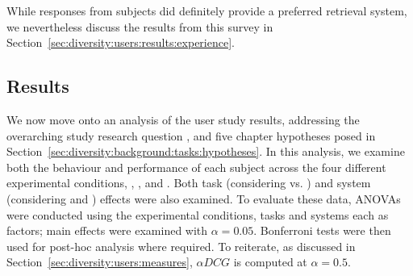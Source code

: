 While responses from subjects did definitely provide a preferred retrieval system, we nevertheless discuss the results from this survey in Section~\ref{sec:diversity:users:results:experience}.

\subsection{Results}
We now move onto an analysis of the user study results, addressing the overarching study research question , and five chapter hypotheses posed in Section~\ref{sec:diversity:background:tasks:hypotheses}. In this analysis, we examine both the behaviour and performance of each subject across the four different experimental conditions, , ,  and . Both task (considering  vs. ) and system (considering  and ) effects were also examined. To evaluate these data, ANOVAs were conducted using the experimental conditions, tasks and systems each as factors; main effects were examined with $\alpha=0.05$. Bonferroni tests were then used for post-hoc analysis where required. To reiterate, as discussed in Section~\ref{sec:diversity:users:measures}, $\alpha DCG$ is computed at $\alpha=0.5$.

